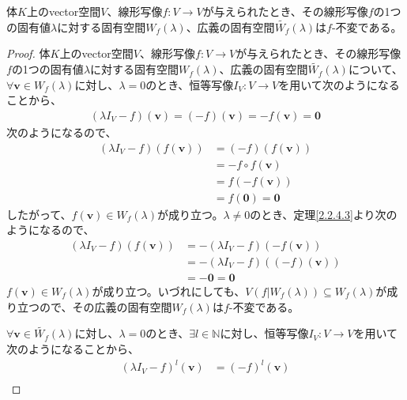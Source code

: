 \documentclass[dvipdfmx]{jsarticle}
\begin{document}
\begin{thm}
\label{2.2.4.10}
体$K$上のvector空間$V$、線形写像$f:V \rightarrow V$が与えられたとき、その線形写像$f$の1つの固有値$\lambda$に対する固有空間$W_{f}(\lambda)$、広義の固有空間$\widetilde{W_{f}}(\lambda)$は$f$-不変である。
\end{thm}
\begin{proof}
体$K$上のvector空間$V$、線形写像$f:V \rightarrow V$が与えられたとき、その線形写像$f$の1つの固有値$\lambda$に対する固有空間$W_{f}(\lambda)$、広義の固有空間$\widetilde{W_{f}}(\lambda)$について、$\forall\mathbf{v} \in W_{f}(\lambda)$に対し、$\lambda = 0$のとき、恒等写像$I_{V}:V \rightarrow V$を用いて次のようになることから、
\begin{align*}
\left( \lambda I_{V} - f \right)\left( \mathbf{v} \right) = ( - f)\left( \mathbf{v} \right) = - f\left( \mathbf{v} \right) = \mathbf{0}
\end{align*}
次のようになるので、
\begin{align*}
\left( \lambda I_{V} - f \right)\left( f\left( \mathbf{v} \right) \right) &= ( - f)\left( f\left( \mathbf{v} \right) \right)\\
&= - f \circ f\left( \mathbf{v} \right)\\
&= f\left( - f\left( \mathbf{v} \right) \right)\\
&= f\left( \mathbf{0} \right) = \mathbf{0}
\end{align*}
したがって、$f\left( \mathbf{v} \right) \in W_{f}(\lambda)$が成り立つ。$\lambda \neq 0$のとき、定理\ref{2.2.4.3}より次のようになるので、
\begin{align*}
\left( \lambda I_{V} - f \right)\left( f\left( \mathbf{v} \right) \right) &= - \left( \lambda I_{V} - f \right)\left( - f\left( \mathbf{v} \right) \right)\\
&= - \left( \lambda I_{V} - f \right)\left( ( - f)\left( \mathbf{v} \right) \right)\\
&= - \mathbf{0} = \mathbf{0}
\end{align*}
$f\left( \mathbf{v} \right) \in W_{f}(\lambda)$が成り立つ。いづれにしても、$V\left( f|W_{f}(\lambda) \right) \subseteq W_{f}(\lambda)$が成り立つので、その広義の固有空間$W_{f}(\lambda)$は$f$-不変である。\par
$\forall\mathbf{v} \in \widetilde{W_{f}}(\lambda)$に対し、$\lambda = 0$のとき、$\exists l \in \mathbb{N}$に対し、恒等写像$I_{V}:V \rightarrow V$を用いて次のようになることから、
\begin{align*}
\left( \lambda I_{V} - f \right)^{l}\left( \mathbf{v} \right) &= ( - f)^{l}\left( \mathbf{v} \right)\\

\end{align*}
\end{proof}
\end{document}
